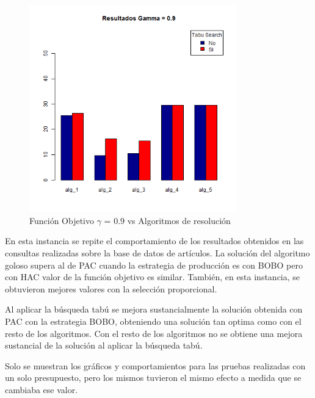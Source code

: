\begin{figure}[H]
  \centering
    \includegraphics[width=0.8\textwidth]{resultados/cities/Graficos_agrupados/gamma09-cities.png}
  \caption{Función Objetivo $\gamma$ = $0.9$ vs Algoritmos de resolución}
  \label{res:img-cities-agr-gamma09}
\end{figure}

En esta instancia se repite el comportamiento de los resultados obtenidos en las consultas realizadas sobre la base de datos de artículos. La solución del algoritmo goloso supera al de PAC cuando la estrategia de producción es con BOBO pero con HAC valor de la función objetivo es similar. También, en esta instancia, se obtuvieron mejores valores con la selección proporcional.

Al aplicar la búsqueda tabú se mejora sustancialmente la solución obtenida con PAC con la estrategia BOBO, obteniendo una solución tan optima como con el resto de los algoritmos. Con el resto de los algoritmos no se obtiene una mejora sustancial de la solución al aplicar la búsqueda tabú.

Solo se muestran los gráficos y comportamientos para las pruebas realizadas con un solo presupuesto, pero los mismos tuvieron el mismo efecto a medida que se cambiaba ese valor.

